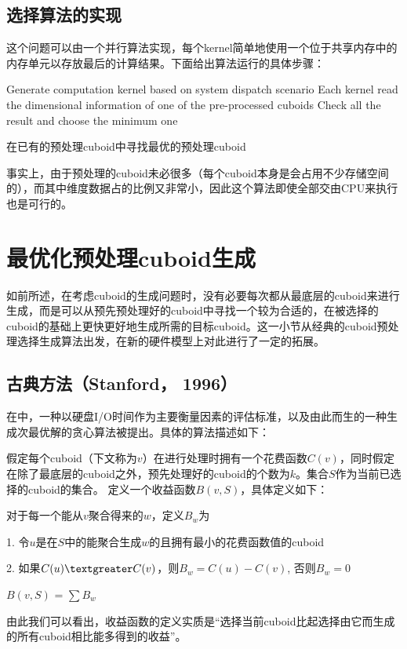 \subsection{选择算法的实现}
这个问题可以由一个并行算法实现，每个kernel简单地使用一个位于共享内存中的内存单元以存放最后的计算结果。下面给出算法运行的具体步骤：

\begin{algorithm}[htbp]
\SetAlgoLined
{}
Generate computation kernel based on system dispatch scenario\;
Each kernel read the dimensional information of one of the pre-processed cuboids\;
Check all the result and choose the minimum one\;
\caption{在已有的预处理cuboid中寻找最优的预处理cuboid}
\label{algo:algorithm3}
\end{algorithm}

事实上，由于预处理的cuboid未必很多（每个cuboid本身是会占用不少存储空间的），而其中维度数据占的比例又非常小，因此这个算法即使全部交由CPU来执行也是可行的。

\section{最优化预处理cuboid生成}
如前所述，在考虑cuboid的生成问题时，没有必要每次都从最底层的cuboid来进行生成，而是可以从预先预处理好的cuboid中寻找一个较为合适的，在被选择的cuboid的基础上更快更好地生成所需的目标cuboid。这一小节从经典的cuboid预处理选择生成算法出发，在新的硬件模型上对此进行了一定的拓展。

\subsection{古典方法（Stanford， 1996）}
在\cite{HarinarayanSIGMOD1996}中，一种以硬盘I/O时间作为主要衡量因素的评估标准，以及由此而生的一种生成次最优解的贪心算法被提出。具体的算法描述如下：

假定每个cuboid（下文称为$v$）在进行处理时拥有一个花费函数$C(v)$，同时假定在除了最底层的cuboid之外，预先处理好的cuboid的个数为$k$。集合$S$作为当前已选择的cuboid的集合。
定义一个收益函数$B(v, S)$，具体定义如下：

\begin{definition}
对于每一个能从$v$聚合得来的$w$，定义$B_w$为

{\quad}1. 令$u$是在$S$中的能聚合生成$w$的且拥有最小的花费函数值的cuboid

{\quad}2. 如果$C(u) \textgreater C(v)$，则$B_w = C(u) - C(v)$, 否则$B_w = 0$

$B(v, S)$ = $\sum B_w$
\end{definition}
由此我们可以看出，收益函数的定义实质是“选择当前cuboid比起选择由它而生成的所有cuboid相比能多得到的收益”。

